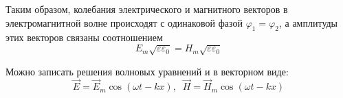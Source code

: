 \documentclass{article}
\begin{document}
	Таким образом, колебания электрического и магнитного векторов в электромагнитной волне происходят с одинаковой фазой $\varphi_1=\varphi_2$, а амплитуды этих векторов связаны соотношением
	\begin{equation}
		E_m\sqrt{\varepsilon\varepsilon_0}=H_m\sqrt{\varepsilon\varepsilon_0}
	\end{equation}

	Можно записать решения волновых уравнений и в векторном виде:
	\begin{equation}
		\vec E = \vec E_m\cos(\omega t - kx),\;\;\vec H = \vec H_m\cos(\omega t - kx)
	\end{equation}
\end{document}

